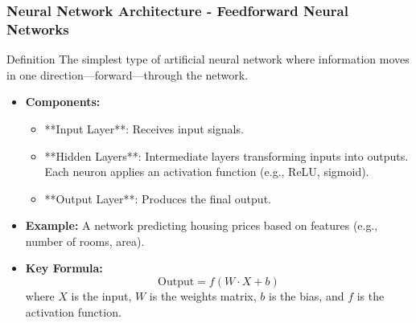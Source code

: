 \documentclass[aspectratio=169]{beamer}
\begin{document}
\begin{frame}[fragile]
    \frametitle{Neural Network Architecture - Feedforward Neural Networks}
    \begin{block}{Definition}
        The simplest type of artificial neural network where information moves in one direction—forward—through the network.
    \end{block}
    \begin{itemize}
        \item \textbf{Components:}
            \begin{itemize}
                \item **Input Layer**: Receives input signals.
                \item **Hidden Layers**: Intermediate layers transforming inputs into outputs. Each neuron applies an activation function (e.g., ReLU, sigmoid).
                \item **Output Layer**: Produces the final output.
            \end{itemize}
        
        \item \textbf{Example:} A network predicting housing prices based on features (e.g., number of rooms, area).
        
        \item \textbf{Key Formula:}
        \begin{equation}
            \text{Output} = f(W \cdot X + b)
        \end{equation}
        where \( X \) is the input, \( W \) is the weights matrix, \( b \) is the bias, and \( f \) is the activation function.
    \end{itemize}
\end{frame}
\end{document}
